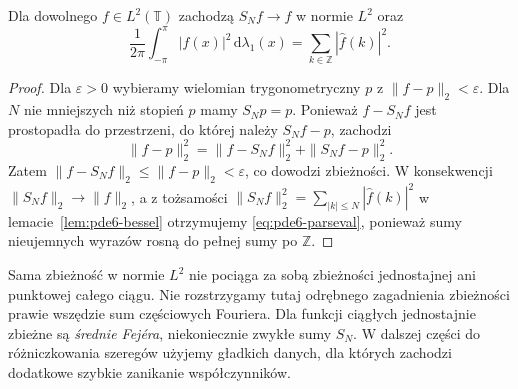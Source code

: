 \begin{twierdzenie}
\label{thm:pde6-parseval}
Dla dowolnego $f\in L^2(\mathbb T)$ zachodzą
$S_Nf\to f$ w normie $L^2$ oraz
\begin{equation}\label{eq:pde6-parseval}
 \frac1{2\pi}\int_{-\pi}^{\pi}|f(x)|^2\,\mathrm d\lambda_1(x)
 =\sum_{k\in\mathbb Z}|\widehat f(k)|^2.
\end{equation}
\end{twierdzenie}
\begin{proof}
Dla $\varepsilon>0$ wybieramy wielomian trygonometryczny $p$
z $\|f-p\|_2<\varepsilon$. Dla $N$ nie mniejszych niż stopień
$p$ mamy $S_Np=p$. Ponieważ $f-S_Nf$ jest
prostopadła do przestrzeni, do której należy
$S_Nf-p$, zachodzi
\[
 \|f-p\|_2^2=\|f-S_Nf\|_2^2+\|S_Nf-p\|_2^2.
\]
Zatem $\|f-S_Nf\|_2\leq\|f-p\|_2<\varepsilon$,
co dowodzi zbieżności.
W konsekwencji $\|S_Nf\|_2\to\|f\|_2$,
a z tożsamości $\|S_Nf\|_2^2=
\sum_{|k|\leq N}|\widehat f(k)|^2$
w lemacie~\ref{lem:pde6-bessel} otrzymujemy
\eqref{eq:pde6-parseval}, ponieważ sumy
nieujemnych wyrazów rosną do pełnej sumy po $\mathbb Z$.
\end{proof}

\begin{uwaga}
Sama zbieżność w normie $L^2$ nie pociąga
za sobą zbieżności jednostajnej ani punktowej
całego ciągu. Nie rozstrzygamy tutaj odrębnego
zagadnienia zbieżności prawie wszędzie sum
częściowych Fouriera. Dla funkcji ciągłych jednostajnie zbieżne są
\emph{średnie Fejéra}, niekoniecznie zwykłe sumy $S_N$.
W dalszej części do różniczkowania szeregów użyjemy
gładkich danych, dla których zachodzi dodatkowe szybkie
zanikanie współczynników.
\end{uwaga}

